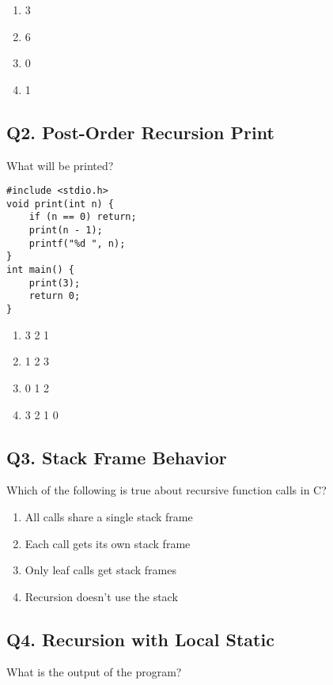 \begin{enumerate}[label=(\alph*)]
    \item 3
    \item 6
    \item 0
    \item 1
\end{enumerate}

\vspace{1em}
\subsection*{Q2. Post-Order Recursion Print}
What will be printed?

\begin{lstlisting}
#include <stdio.h>
void print(int n) {
    if (n == 0) return;
    print(n - 1);
    printf("%d ", n);
}
int main() {
    print(3);
    return 0;
}
\end{lstlisting}

\begin{enumerate}[label=(\alph*)]
    \item 3 2 1
    \item 1 2 3
    \item 0 1 2
    \item 3 2 1 0
\end{enumerate}

\vspace{1em}
\subsection*{Q3. Stack Frame Behavior}
Which of the following is true about recursive function calls in C?

\begin{enumerate}[label=(\alph*)]
    \item All calls share a single stack frame
    \item Each call gets its own stack frame
    \item Only leaf calls get stack frames
    \item Recursion doesn't use the stack
\end{enumerate}

\vspace{1em}
\subsection*{Q4. Recursion with Local Static}
What is the output of the program?

